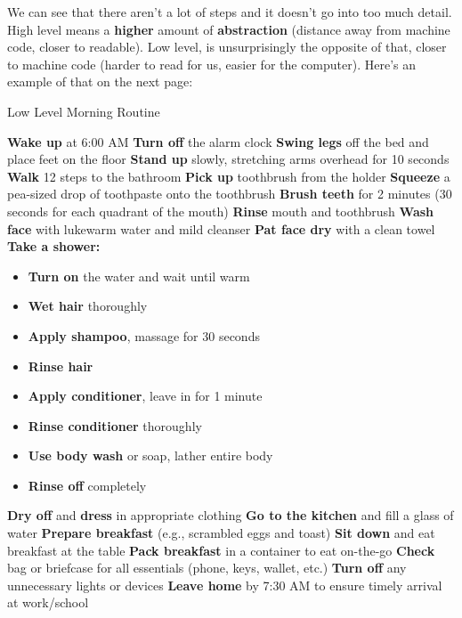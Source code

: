 \documentclass[a4paper,12pt]{article}
\begin{document}
We can see that there aren't a lot of steps and it doesn't go into too much detail. High level means a \textbf{higher} amount of \textbf{abstraction} (distance away from machine code, closer to readable). Low level, is unsurprisingly the opposite of that, closer to machine code (harder to read for us, easier for the computer). Here's an example of that on the next page:

\begin{algorithm}[H]
\caption{Low Level Morning Routine}
\begin{algorithmic}[1]
    \State \textbf{Wake up} at 6:00 AM
    \State \textbf{Turn off} the alarm clock
    \State \textbf{Swing legs} off the bed and place feet on the floor
    \State \textbf{Stand up} slowly, stretching arms overhead for 10 seconds
    \State \textbf{Walk} 12 steps to the bathroom
    \State \textbf{Pick up} toothbrush from the holder
    \State \textbf{Squeeze} a pea-sized drop of toothpaste onto the toothbrush
    \State \textbf{Brush teeth} for 2 minutes (30 seconds for each quadrant of the mouth)
    \State \textbf{Rinse} mouth and toothbrush
    \State \textbf{Wash face} with lukewarm water and mild cleanser
    \State \textbf{Pat face dry} with a clean towel
    \State \textbf{Take a shower:}
        \begin{itemize}
            \item \textbf{Turn on} the water and wait until warm
            \item \textbf{Wet hair} thoroughly
            \item \textbf{Apply shampoo}, massage for 30 seconds
            \item \textbf{Rinse hair}
            \item \textbf{Apply conditioner}, leave in for 1 minute
            \item \textbf{Rinse conditioner} thoroughly
            \item \textbf{Use body wash} or soap, lather entire body
            \item \textbf{Rinse off} completely
        \end{itemize}
    \State \textbf{Dry off} and \textbf{dress} in appropriate clothing
    \State \textbf{Go to the kitchen} and fill a glass of water
    \State \textbf{Prepare breakfast} (e.g., scrambled eggs and toast)
        \State \textbf{Sit down} and eat breakfast at the table
    \Else
        \State \textbf{Pack breakfast} in a container to eat on-the-go
    \EndIf
    \State \textbf{Check} bag or briefcase for all essentials (phone, keys, wallet, etc.)
    \State \textbf{Turn off} any unnecessary lights or devices
    \State \textbf{Leave home} by 7:30 AM to ensure timely arrival at work/school
\EndProcedure
\end{algorithmic}
\end{algorithm}
\end{document}
